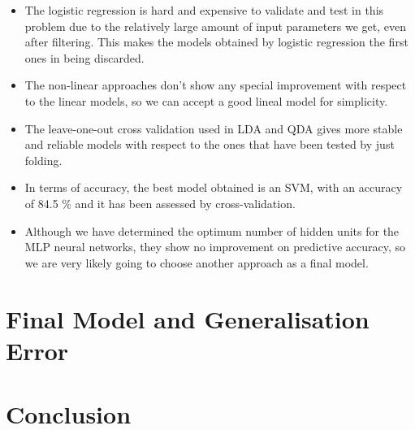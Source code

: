 \documentclass[english]{scrartcl}
\begin{document}
\begin{itemize}
\item The logistic regression is hard and expensive to validate and test in this 
problem due to the relatively large amount of input parameters we get, even after
filtering. This makes the models obtained by logistic regression the first ones 
in being discarded.

\item The non-linear approaches don't show any special improvement with respect
to the linear models, so we can accept a good lineal model for simplicity.

\item The leave-one-out cross validation used in LDA and QDA gives more stable
and reliable models with respect to the ones that have been tested by just folding.

\item In terms of accuracy, the best model obtained is an SVM, with an accuracy
of 84.5 \% and it has been assessed by cross-validation.

\item Although we have determined the optimum number of hidden units for the 
MLP neural networks, they show no improvement on predictive accuracy, so we
are very likely going to choose another approach as a final model.
\end{itemize}

\section{Final Model and Generalisation Error}

\section{Conclusion}
\end{document}
